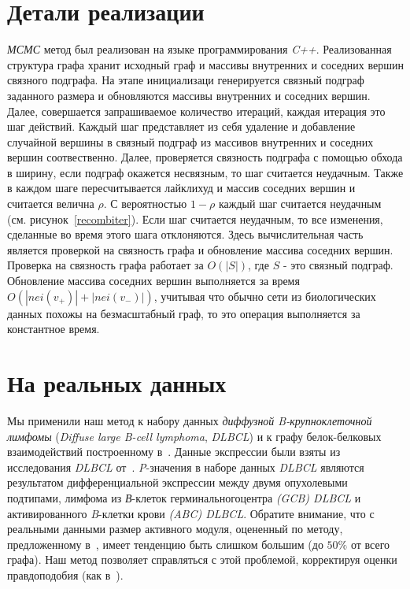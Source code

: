 \section{Детали реализации}
\emph{МСМС} метод был реализован на языке программирования \emph{C++}.
Реализованная структура графа хранит исходный граф и массивы внутренних
и соседних вершин связного подграфа.  На этапе инициализаци генерируется
связный подграф заданного размера и обновляются массивы внутренних и соседних
вершин.  Далее, совершается запрашиваемое количество итераций, каждая итерация
это шаг действий.  Каждый шаг представляет из себя удаление и добавление
случайной вершины в связный подграф из массивов внутренних и соседних вершин
соотвественно.  Далее, проверяется связность подграфа с помощью обхода
в ширину, если подграф окажется несвязным, то шаг считается неудачным.  Также
в каждом шаге пересчитывается лайклихуд и массив соседних вершин и считается
велична $\rho$. С вероятностью $1 - \rho$ каждый шаг считается неудачным (см.
рисунок~\ref{recombiter}).  Если шаг считается неудачным, то все изменения,
сделанные во время этого шага отклоняются.  Здесь вычислительная часть является
проверкой на связность графа и обновление массива соседних вершин.  Проверка на
связность графа работает за $O(|S|)$, где $S$ - это связный подграф.
Обновление массива соседних вершин выполняется за время
$O(|nei(v_+)|+|nei(v_-)|)$, учитывая что обычно сети из биологических данных
похожы на безмасштабный граф, то это операция выполняется за константное время.





\section{На реальных данных}

Мы применили наш метод к набору данных \emph{диффузной B-крупноклеточной
лимфомы} (\emph{Diffuse large B-cell lymphoma}, \emph{DLBCL}) и к графу
белок-белковых взаимодействий построенному в~\cite{Dittrich2008a}.  Данные
экспрессии были взяты из исследования \emph{DLBCL} от~\cite{Alizadeh2000}.
\emph{P}-значения в наборе данных \emph{DLBCL} являются результатом
дифференциальной экспрессии между двумя опухолевыми подтипами, лимфома из
\emph{В}-клеток герминальногоцентра \emph{(GCB) DLBCL} и активированного
\emph{B}-клетки крови \emph{(ABC) DLBCL}. Обратите внимание, что с реальными
данными размер активного модуля, оцененный по методу, предложенному
в~\cite{Dittrich2008a}, имеет тенденцию быть слишком большим (до $50\%$ от
всего графа). Наш метод позволяет справляться с этой проблемой, корректируя
оценки правдоподобия (как в~\cite{Dittrich2008a}).

